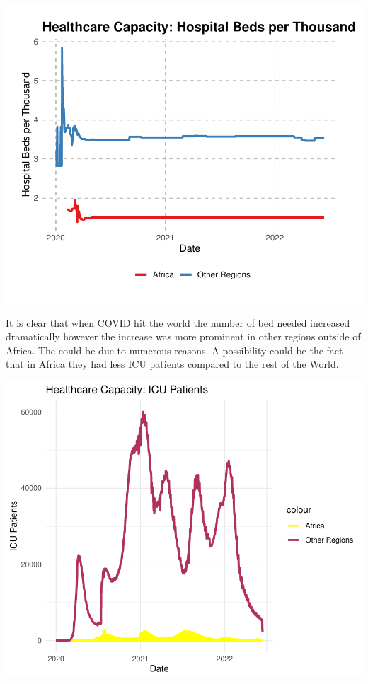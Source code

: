 \documentclass[12pt,preprint, authoryear]{elsarticle}
\let\origfigure\figure
\let\endorigfigure\endfigure
\renewenvironment{figure}[1][2] {
    \expandafter\origfigure\expandafter[H]
} {
    \endorigfigure
}
\numberwithin{equation}{section}
\numberwithin{figure}{section}
\numberwithin{table}{section}
\begin{document}
\begin{figure}[H]

{\centering \includegraphics{Q1_files/figure-latex/Figure3-1} 

}

\caption{Hospital Beds \label{Figure3}}\label{fig:Figure3}
\end{figure}

It is clear that when COVID hit the world the number of bed needed
increased dramatically however the increase was more prominent in other
regions outside of Africa. The could be due to numerous reasons. A
possibility could be the fact that in Africa they had less ICU patients
compared to the rest of the World.

\begin{figure}[H]

{\centering \includegraphics{Q1_files/figure-latex/Figure4-1} 

}

\caption{ICU Patients \label{Figure4}}\label{fig:Figure4}
\end{figure}
\end{document}
